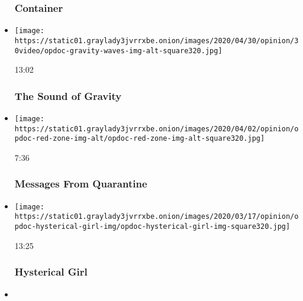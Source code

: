 \begin{itemize}
  \hypertarget{container}{%
  \subsubsection{Container}\label{container}}
\item
  \href{https://www.nytimes3xbfgragh.onion/video/opinion/100000006819172/the-sound-of-gravity.html?action=click\&module=video-series-bar\&region=header\&pgtype=Article\&playlistId=video/op-docs}{}

  \texttt{[image: https://static01.graylady3jvrrxbe.onion/images/2020/04/30/opinion/30video/opdoc-gravity-waves-img-alt-square320.jpg]}

  13:02

  \hypertarget{the-sound-of-gravity}{%
  \subsubsection{The Sound of Gravity}\label{the-sound-of-gravity}}
\item
  \href{https://www.nytimes3xbfgragh.onion/video/opinion/100000007062353/coronavirus-messages-from-quarantine.html?action=click\&module=video-series-bar\&region=header\&pgtype=Article\&playlistId=video/op-docs}{}

  \texttt{[image: https://static01.graylady3jvrrxbe.onion/images/2020/04/02/opinion/opdoc-red-zone-img-alt/opdoc-red-zone-img-alt-square320.jpg]}

  7:36

  \hypertarget{messages-from-quarantine}{%
  \subsubsection{Messages From
  Quarantine}\label{messages-from-quarantine}}
\item
  \href{https://www.nytimes3xbfgragh.onion/video/opinion/100000007026836/hysterical-girl.html?action=click\&module=video-series-bar\&region=header\&pgtype=Article\&playlistId=video/op-docs}{}

  \texttt{[image: https://static01.graylady3jvrrxbe.onion/images/2020/03/17/opinion/opdoc-hysterical-girl-img/opdoc-hysterical-girl-img-square320.jpg]}

  13:25

  \hypertarget{hysterical-girl}{%
  \subsubsection{Hysterical Girl}\label{hysterical-girl}}
\item
  \href{https://www.nytimes3xbfgragh.onion/video/opinion/100000007013675/self-quarantined-for-the-holidays.html?action=click\&module=video-series-bar\&region=header\&pgtype=Article\&playlistId=video/op-docs}{}


\end{itemize}
